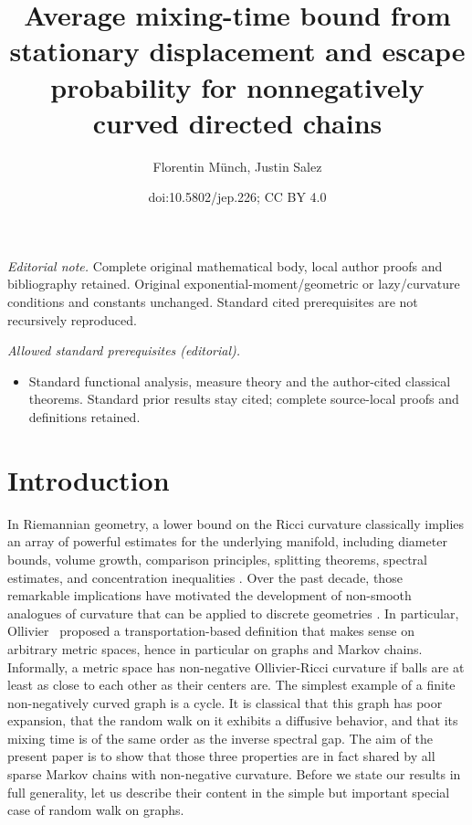 \documentclass[10pt]{amsart}
\title{Average mixing-time bound from stationary displacement and escape probability for nonnegatively curved directed chains}
\author{Florentin Münch, Justin Salez}
\date{doi:10.5802/jep.226; CC BY 4.0}
\theoremstyle{definition}
\begin{document}
\maketitle
\noindent\textit{Editorial note.} Complete original mathematical body, local author proofs and bibliography retained. Original exponential-moment/geometric or lazy/curvature conditions and constants unchanged. Standard cited prerequisites are not recursively reproduced.\par\medskip
\noindent\textit{Allowed standard prerequisites (editorial).}\begin{itemize}
\item Standard functional analysis, measure theory and the author-cited classical theorems. Standard prior results stay cited; complete source-local proofs and definitions retained.
\end{itemize}\medskip
\vspace*{-\baselineskip}
\tableofcontents


\section{Introduction}
In Riemannian geometry, a lower bound on the Ricci curvature classically implies an array of powerful estimates for the underlying manifold, including diameter bounds, volume growth, comparison principles, splitting theorems, spectral estimates, and concentration inequalities \cite{jost2017a}. Over the past decade, those remarkable implications have motivated the development of non-smooth analogues of curvature that can be applied to discrete geometries
\cite{schmuckenschlager1998curvature,lin2010ricci,
forman2003bochner,erbar2012ricci,ollivier2009ricci,
jost2021characterizations,najman2017modern, munch2017ollivier}.
In particular, \hbox{Ollivier}~\cite{ollivier2009ricci} proposed a transportation-based definition that makes sense on arbitrary metric spaces, hence in particular on graphs and Markov chains.
Informally, a metric space has non-negative Ollivier-Ricci curvature if balls are at least as close to each other as their centers are. The simplest example of a finite non-negatively curved graph is a cycle. It is classical that this graph has poor expansion, that the random walk on it exhibits a diffusive behavior, and that its mixing time is of the same order as the inverse spectral gap. The aim of the present paper is to show that those three properties are in fact shared by all sparse Markov chains with non-negative curvature. Before we state our results in full generality, let us describe their content in the simple but important special case of random walk on graphs.
\end{document}
